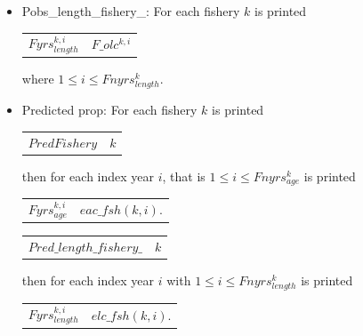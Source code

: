 \documentclass{article}
\begin{document}
\begin{itemize}
\begin{center}
\begin{tabular}{c c}
        \end{tabular}
    \end{center}
    \item Pobs\_length\_fishery\_: For each fishery $k$ is printed 
    \begin{center}
        \begin{tabular}{c c}
          $Fyrs^{k,i}_{length}$   &  $F\_olc^{k,i}$\\
            \end{tabular}        
    \end{center}
    where $1\leq i \leq Fnyrs^k_{length}$.
    
    \item Predicted prop: For each fishery $k$ is printed
    \begin{center}
        \begin{tabular}{c c}
            $PredFishery$  &  $k$ \\
            
        \end{tabular}
    \end{center}
    then for each index year $i$, that is $1\leq i \leq Fnyrs^k_{age}$ is printed
    \begin{center}
        \begin{tabular}{c c}
          $Fyrs^{k,i}_{age}$   &  $eac\_fsh(k,i)$.\\
        \end{tabular}
    \end{center}


    \begin{center}
        \begin{tabular}{c c}
            $Pred\_length\_fishery\_$  &  $k$ \\
            
        \end{tabular}
    \end{center}
   then for each  index year $i$ with $1\leq i \leq Fnyrs^k_{length}$ is printed
    \begin{center}
        \begin{tabular}{c c}
           $Fyrs^{k,i}_{length}$  & $elc\_fsh(k,i)$.\\ 
        \end{tabular}
    \end{center}


\end{itemize}
\end{document}
